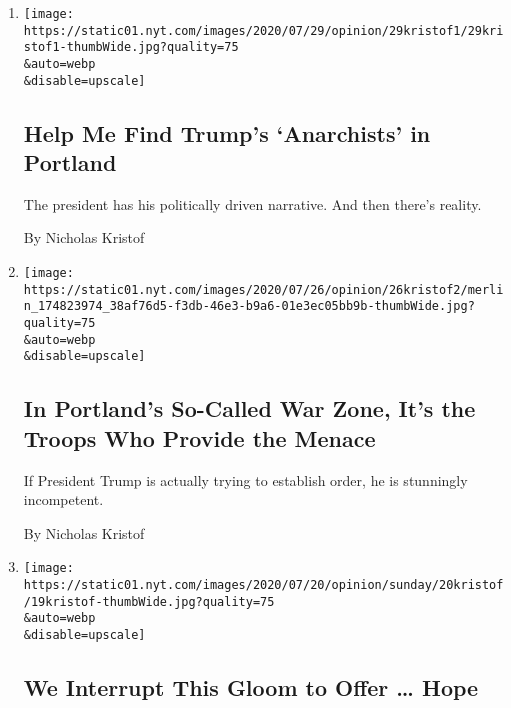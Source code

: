 \begin{enumerate}
\def\labelenumi{\arabic{enumi}.}
\item
  \href{/2020/07/29/opinion/portland-protests-trump.html}{}

  \texttt{[image: https://static01.nyt.com/images/2020/07/29/opinion/29kristof1/29kristof1-thumbWide.jpg?quality=75\\\&auto=webp\\\&disable=upscale]}

  \hypertarget{help-me-find-trumps-anarchists-in-portland}{%
  \subsection{Help Me Find Trump's `Anarchists' in
  Portland}\label{help-me-find-trumps-anarchists-in-portland}}

  The president has his politically driven narrative. And then there's
  reality.

  By Nicholas Kristof
\item
  \href{/2020/07/25/opinion/sunday/portland-protest-federal-troops.html}{}

  \texttt{[image: https://static01.nyt.com/images/2020/07/26/opinion/26kristof2/merlin\_174823974\_38af76d5-f3db-46e3-b9a6-01e3ec05bb9b-thumbWide.jpg?quality=75\\\&auto=webp\\\&disable=upscale]}

  \hypertarget{in-portlands-so-called-war-zone-its-the-troops-who-provide-the-menace}{%
  \subsection{In Portland's So-Called War Zone, It's the Troops Who
  Provide the
  Menace}\label{in-portlands-so-called-war-zone-its-the-troops-who-provide-the-menace}}

  If President Trump is actually trying to establish order, he is
  stunningly incompetent.

  By Nicholas Kristof
\item
  \href{/2020/07/16/opinion/sunday/coronavirus-blm-america-hope.html}{}

  \texttt{[image: https://static01.nyt.com/images/2020/07/20/opinion/sunday/20kristof/19kristof-thumbWide.jpg?quality=75\\\&auto=webp\\\&disable=upscale]}

  \hypertarget{we-interrupt-this-gloom-to-offer--hope}{%
  \subsection{We Interrupt This Gloom to Offer \ldots{}
  Hope}\label{we-interrupt-this-gloom-to-offer--hope}}


\end{enumerate}
